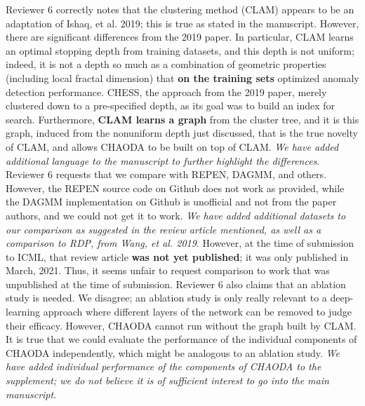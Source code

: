 \documentclass{article}
\begin{document}
Reviewer 6 correctly notes that the clustering method (CLAM) appears to be an adaptation of Ishaq, et al. 2019; this is true as stated in the manuscript.
However, there are significant differences from the 2019 paper.
In particular, CLAM learns an optimal stopping depth from training datasets, and this depth is not uniform; indeed, it is not a depth so much as a combination of geometric properties (including local fractal dimension) that \textbf{on the training sets} optimized anomaly detection performance. CHESS, the approach from the 2019 paper, merely clustered down to a pre-specified depth, as its goal was to build an index for search.
Furthermore, \textbf{CLAM learns a graph} from the cluster tree, and it is this graph, induced from the nonuniform depth just discussed, that is the true novelty of CLAM, and allows CHAODA to be built on top of CLAM.
\emph{We have added additional language to the manuscript to further highlight the differences}.
Reviewer 6 requests that we compare with REPEN, DAGMM, and others.
However, the REPEN source code on Github does not work as provided, while the DAGMM implementation on Github is unofficial and not from the paper authors, and we could not get it to work.
\emph{We have added additional datasets to our comparison as suggested in the review article mentioned, as well as a comparison to RDP, from Wang, et al. 2019}.
However, at the time of submission to ICML, that review article \textbf{was not yet published}; it was only published in March, 2021.
Thus, it seems unfair to request comparison to work that was unpublished at the time of submission.
Reviewer 6 also claims that an ablation study is needed.
We disagree; an ablation study is only really relevant to a deep-learning approach where different layers of the network can be removed to judge their efficacy.
However, CHAODA cannot run without the graph built by CLAM.
It is true that we could evaluate the performance of the individual components of CHAODA independently, which might be analogous to an ablation study.
\emph{We have added individual performance of the components of CHAODA to the supplement; we do not believe it is of sufficient interest to go into the main manuscript}.
\end{document}

